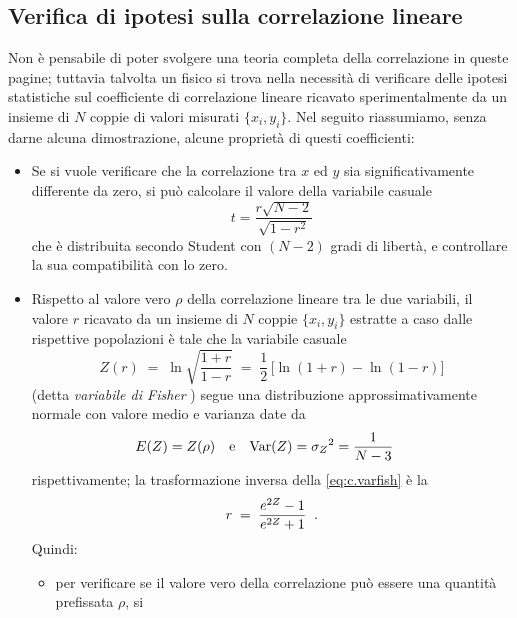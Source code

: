 \subsection{Verifica di ipotesi sulla correlazione lineare}%
Non \`e pensabile di poter svolgere una teoria completa
della correlazione in queste pagine; tuttavia talvolta un
fisico si trova nella necessit\`a di verificare delle
ipotesi statistiche sul coefficiente di correlazione lineare
ricavato sperimentalmente da un insieme di $N$ coppie di
valori misurati $\{ x_i, y_i \}$.  Nel seguito riassumiamo,
senza darne alcuna dimostrazione, alcune propriet\`a di
questi coefficienti:
\begin{itemize}
\item Se si vuole verificare che la correlazione tra $x$ ed
  $y$ sia significativamente differente da zero, si pu\`o
  calcolare il valore della variabile casuale
  \begin{equation*}
    t = \frac{r \sqrt{N-2}}{\sqrt{1 - r^2}}
  \end{equation*}
  che \`e distribuita secondo Student%
  con $(N-2)$ gradi di libert\`a, e controllare la sua
  compatibilit\`a con lo zero.
\item Rispetto al valore vero $\rho$ della correlazione
  lineare tra le due variabili, il valore $r$ ricavato da un
  insieme di $N$ coppie $\{ x_i, y_i \}$ estratte a caso
  dalle rispettive popolazioni \`e tale che la variabile
  casuale
  \begin{equation} \label{eq:c.varfish}
    Z(r) \; = \; \ln \sqrt{ \frac{1 + r}{1 - r} } \; = \;
      \frac{1}{2} \, \bigl[ \ln ( 1 + r ) - \ln ( 1 - r)
      \bigr]
  \end{equation}
  (detta \emph{variabile di Fisher}%
  ) segue una distribuzione approssimativamente normale con
  valore medio e varianza date da
  \begin{align*}
    E(Z) &= Z(\rho) &&\text{e} & \operatorname{Var}(Z) &= {\sigma_Z}^2 =
      \frac{1}{N-3}
  \end{align*}
  rispettivamente; la trasformazione inversa della
  \eqref{eq:c.varfish} \`e la
  \begin{equation*}
    r \; = \; \frac{e^{2Z} - 1}{e^{2Z} + 1} \;\; .
  \end{equation*}
  Quindi:
  \begin{itemize}
  \item per verificare se il valore vero della correlazione
    pu\`o essere una quantit\`a prefissata $\rho$, si

\end{itemize}
\end{itemize}
